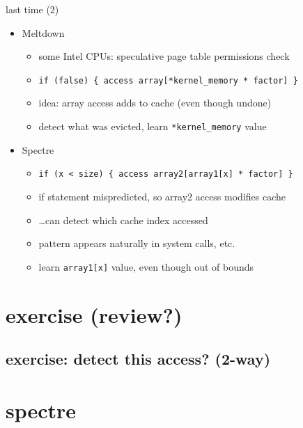 \begin{frame}[fragile]{last time (2)}
    \begin{itemize}
    \item Meltdown 
        \begin{itemize}
        \item some Intel CPUs: speculative page table permissions check
        \item \verb|if (false) { access array[*kernel_memory * factor] }|
        \item idea: array access adds to cache (even though undone)
        \item detect what was evicted, learn \verb|*kernel_memory| value
        \end{itemize}
    \item Spectre
        \begin{itemize}
        \item \verb|if (x < size) { access array2[array1[x] * factor] }|
        \item if statement mispredicted, so array2 access modifies cache
        \item \ldots can detect which cache index accessed
        \item pattern appears naturally in system calls, etc.
        \item learn \verb|array1[x]| value, even though out of bounds
        \end{itemize}
    \end{itemize}
\end{frame}












\section{exercise (review?)}
\subsection{exercise: detect this access? (2-way)}


\section{spectre}

